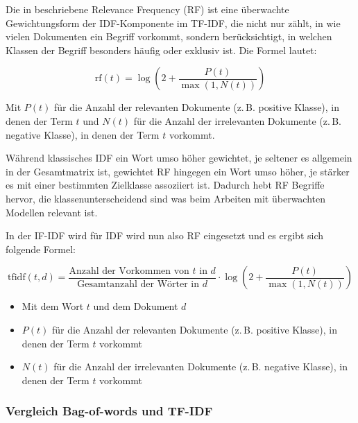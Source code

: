 Die in \cite{Domenico2016} beschriebene Relevance Frequency (RF) ist eine überwachte Gewichtungsform der IDF-Komponente im TF-IDF, die nicht nur zählt, 
in wie vielen Dokumenten ein Begriff vorkommt, sondern berücksichtigt, in welchen Klassen der Begriff besonders häufig oder exklusiv ist.
Die Formel lautet:

\begin{equation}
    \text{rf}(t) = \log\left(2 + \frac{P(t)}{\max(1, N(t))} \right)
\end{equation}

Mit \( P(t) \) für die Anzahl der relevanten Dokumente (z.\,B. positive Klasse), in denen der Term \( t \)
und \( N(t) \) für die Anzahl der irrelevanten Dokumente (z.\,B. negative Klasse), in denen der Term \( t \) vorkommt.

Während klassisches IDF ein Wort umso höher gewichtet, je seltener es allgemein in der Gesamtmatrix ist,
gewichtet RF hingegen ein Wort umso höher, je stärker es mit einer bestimmten Zielklasse assoziiert ist.
Dadurch hebt RF Begriffe hervor, die klassenunterscheidend sind was beim Arbeiten mit überwachten Modellen relevant ist.

In der IF-IDF wird für IDF wird nun also RF eingesetzt und es ergibt sich folgende Formel:

\begin{equation}
    \text{tfidf}(t, d) = \frac{\text{Anzahl der Vorkommen von } t \text{ in } d}{\text{Gesamtanzahl der Wörter in } d} \cdot \log\left(2 + \frac{P(t)}{\max(1, N(t))} \right)
\end{equation}

\begin{itemize}
    \item Mit dem Wort \( t \) und dem Dokument \( d \) 
    \item \( P(t) \) für die Anzahl der relevanten Dokumente (z.\,B. positive Klasse), in denen der Term \( t \) vorkommt
    \item \( N(t) \) für die Anzahl der irrelevanten Dokumente (z.\,B. negative Klasse), in denen der Term \( t \) vorkommt
\end{itemize}

\subsubsection{Vergleich Bag-of-words und TF-IDF}

